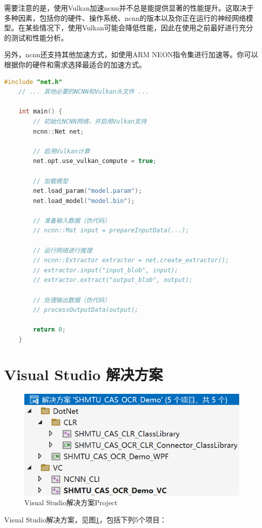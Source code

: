 需要注意的是，使用Vulkan加速ncnn并不总是能提供显著的性能提升。这取决于多种因素，包括你的硬件、操作系统、ncnn的版本以及你正在运行的神经网络模型。在某些情况下，使用Vulkan可能会降低性能，因此在使用之前最好进行充分的测试和性能分析。

另外，ncnn还支持其他加速方式，如使用ARM NEON指令集进行加速等。你可以根据你的硬件和需求选择最适合的加速方式。

\begin{lstlisting}[caption={NCNN with Vulkan Initialization}, language=C++]
	#include "net.h"
	// ... 其他必要的NCNN和Vulkan头文件 ...

	int main() {
		// 初始化NCNN网络，并启用Vulkan支持
		ncnn::Net net;

		// 启用Vulkan计算
		net.opt.use_vulkan_compute = true;

		// 加载模型
		net.load_param("model.param");
		net.load_model("model.bin");

		// 准备输入数据（伪代码）
		// ncnn::Mat input = prepareInputData(...);

		// 运行网络进行推理
		// ncnn::Extractor extractor = net.create_extractor();
		// extractor.input("input_blob", input);
		// extractor.extract("output_blob", output);

		// 处理输出数据（伪代码）
		// processOutputData(output);

		return 0;
	}
\end{lstlisting}

\section{Visual Studio 解决方案}

\begin{figure}
	\centering
	\includegraphics[width=0.7\linewidth]{Resources/Picture/Deploy/Windows/vs}
	\caption{Visual Studio解决方案Project}
	\label{fig:vs_solution}
\end{figure}

Visual Studio解决方案，见图\ref{fig:vs_solution}，包括下列5个项目：

